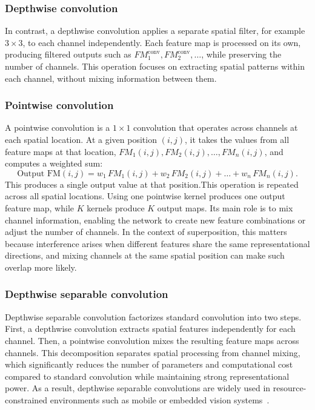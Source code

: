 \documentclass[12pt,a4paper]{report}
\begin{document}
\subsubsection{Depthwise convolution}
In contrast, a depthwise convolution applies a separate spatial filter, for example \(3 \times 3\), to each channel independently. Each feature map is processed on its own, producing filtered outputs such as \(FM_1^{\text{conv}}, FM_2^{\text{conv}}, \dots\), while preserving the number of channels. This operation focuses on extracting spatial patterns within each channel, without mixing information between them.

\subsubsection{Pointwise convolution}
A pointwise convolution is a \(1 \times 1\) convolution that operates across channels at each spatial location. At a given position \((i,j)\), it takes the values from all feature maps at that location, \(FM_1(i,j), FM_2(i,j), \dots, FM_n(i,j)\), and computes a weighted sum:
\[
\text{Output FM}(i,j)= w_1\,FM_1(i,j) + w_2\,FM_2(i,j) + \dots + w_n\,FM_n(i,j).
\]
This produces a single output value at that position.This operation is repeated across all spatial locations. Using one pointwise kernel produces one output feature map, while \(K\) kernels produce \(K\) output maps. Its main role is to mix channel information, enabling the network to create new feature combinations or adjust the number of channels. In the context of superposition, this matters because interference arises when different features share the same representational directions, and mixing channels at the same spatial position can make such overlap more likely.

\subsubsection{Depthwise separable convolution}
Depthwise separable convolution factorizes standard convolution into two steps. First, a depthwise convolution extracts spatial features independently for each channel. Then, a pointwise convolution mixes the resulting feature maps across channels. This decomposition separates spatial processing from channel mixing, which significantly reduces the number of parameters and computational cost compared to standard convolution while maintaining strong representational power. As a result, depthwise separable convolutions are widely used in resource-constrained environments such as mobile or embedded vision systems~\cite{younesi2024}.
\end{document}
